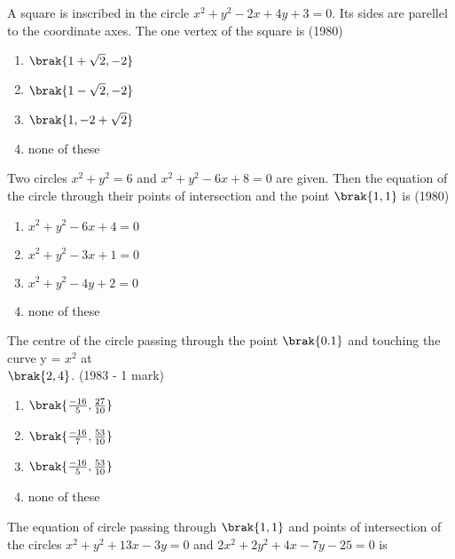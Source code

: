 \iffalse
\title{Circles}
\author{Eshan sharma}
\section{mcq-single}
\fi

    \item A square is inscribed in the circle $x^{2} + y^{2} - 2x +4y +3= 0.$ Its sides are parellel to the coordinate axes. The one vertex of the square is \hfill {(1980)}
    \begin{multicols}{2}
    	\begin{enumerate}
    		\item $\brak{1+\sqrt{2}, -2}$ 
    		\item $\brak{1-\sqrt{2}, -2}$
    		\item $\brak{1, -2 +\sqrt{2}}$
    		\item none of these
    	\end{enumerate}
    \end{multicols}
    \item Two circles $x^{2} + y^{2} = 6$ and $x^{2} + y^{2}-6x +8=0$ are given. Then the equation of the circle through their points of intersection and the point $\brak{1,1}$ is \hfill {(1980)}
    \begin{enumerate}
    	\item $x^{2}+y^{2}-6x+4=0$ 
    	\item $x^{2}+y^{2}-3x+1=0$
    	\item $x^{2}+y^{2}-4y+2=0$
    	\item none of these
    \end{enumerate}
    \item The centre of the circle passing through the point $\brak{0.1}$ and touching the curve y = $x^{2}$ at \\ $\brak{2,4}$.
    \hfill {(1983 - 1 mark)}
    \begin{multicols}{2}
    	\begin{enumerate}
    		\item $\brak{\frac{-16}{5},\frac{27}{10}}$
    		\item $\brak{\frac{-16}{7},\frac{53}{10}}$
    		\item $\brak{\frac{-16}{5},\frac{53}{10}}$
    		\item none of these
    	\end{enumerate}
    \end{multicols}
    \item The equation of circle passing through $\brak{1,1}$ and points of intersection of the circles $x^{2}+y^{2}+13x-3y=0$ and $2x^{2}+2y^{2}+4x-7y-25=0$ is
